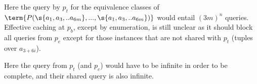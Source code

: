 Here the query by $p_t$ for the equivalence classes of \\
$\term{P(\s{a_1,a_3,..a_{6m}},...,\s{a_1,a_3,..a_{6m}})}$ would entail $(3m)^n$ queries. \\
Effective caching at $p_b$, except by enumeration, is still unclear as it should block all queries from $p_e$ except for those instances that are not shared with $p_t$ (tuples over $a_{3+6i}$).

Here the query from $p_t$ (and $p_e$) would have to be infinite in order to be complete, and their shared query is also infinite.


